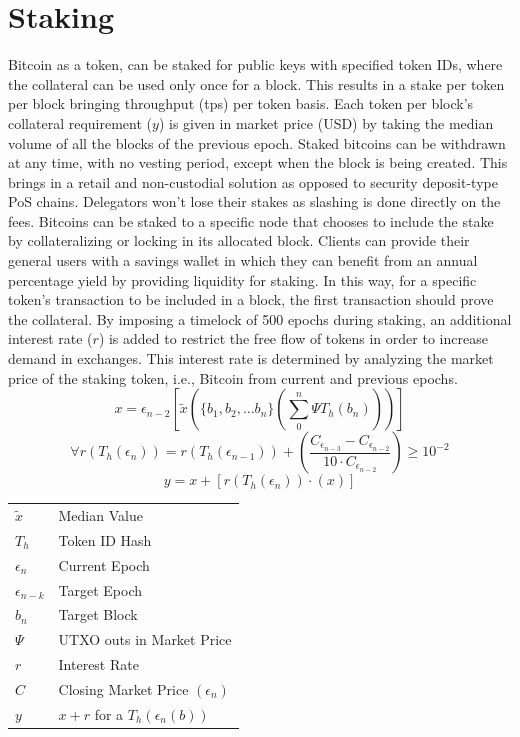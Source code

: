 \documentclass[a4paper,10pt]{article}
\makeatletter
\newenvironment{conditions}
  {\par\vspace{\abovedisplayskip}\noindent\begin{tabular}{>{$}l<{$} @{${}={}$} l}}
  {\end{tabular}\par\vspace{\belowdisplayskip}}
\makeatother
\begin{document}
\section{Staking}
Bitcoin as a token, can be staked for public keys with specified token IDs, where the collateral can be used only once for a block. This results in a stake per token per block bringing throughput (tps) per token basis. Each token per block's collateral requirement ($y$) is given in market price (USD) by taking the median volume of all the blocks of the previous epoch. Staked bitcoins can be withdrawn at any time, with no vesting period, except when the block is being created. This brings in a retail and non-custodial solution as opposed to security deposit-type PoS chains. Delegators won't lose their stakes as slashing is done directly on the fees. Bitcoins can be staked to a specific node that chooses to include the stake by collateralizing or locking in its allocated block. Clients can provide their general users with a savings wallet in which they can benefit from an annual percentage yield by providing liquidity for staking. In this way, for a specific token's transaction to be included in a block, the first transaction should prove the collateral. By imposing a timelock of 500 epochs during staking, an additional interest rate ($r$) is added to restrict the free flow of tokens in order to increase demand in exchanges. This interest rate is determined by analyzing the market price of the staking token, i.e., Bitcoin from current and previous epochs.
\begin{equation*}
x=\epsilon_{n-2}[\widetilde{x}( \{b_1, b_2, \dots b_n\} (\sum_0^n \Psi T_h(b_n)))]
\end{equation*}
\begin{equation*}
\forall r (T_h(\epsilon_n)) =  r(T_h(\epsilon_{n-1}))  +  (\frac{C_{\epsilon_{n-3}} - C_{\epsilon_{n-2}}}{10  \cdot  C_{\epsilon_{n-2}}}) \geq 10^{-2}
\end{equation*}
\begin{equation*}
y=x+ [r (T_h(\epsilon_n)) \cdot (x)]
\end{equation*}
\begin{conditions}
\widetilde{x} & Median Value\\
T_h & Token ID Hash\\
\epsilon_n & Current Epoch\\
\epsilon_{n-k} & Target Epoch\\
b_n & Target Block\\
\Psi & UTXO outs in Market Price\\
r & Interest Rate\\
C & Closing Market Price $(\epsilon_n)$\\
y & $x+r$ for a $T_h(\epsilon_{n}(b))$
\end{conditions}
\end{document}
